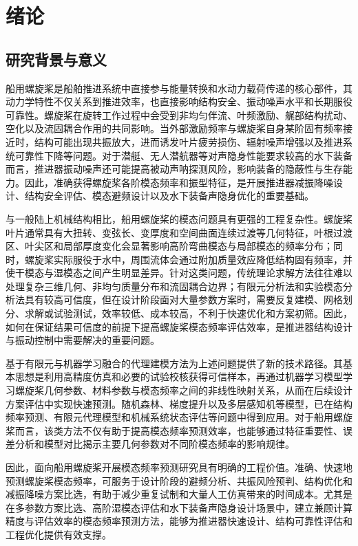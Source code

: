 \chapter{绪论}

\section{研究背景与意义}

船用螺旋桨是船舶推进系统中直接参与能量转换和水动力载荷传递的核心部件，其动力学特性不仅关系到推进效率，也直接影响结构安全、振动噪声水平和长期服役可靠性。螺旋桨在旋转工作过程中会受到非均匀伴流、叶频激励、艉部结构扰动、空化以及流固耦合作用的共同影响。当外部激励频率与螺旋桨自身某阶固有频率接近时，结构可能出现共振放大，进而诱发叶片疲劳损伤、辐射噪声增强以及推进系统可靠性下降等问题。对于潜艇、无人潜航器等对声隐身性能要求较高的水下装备而言，推进器振动噪声还可能提高被动声呐探测风险，影响装备的隐蔽性与生存能力\cite{intro:1}。因此，准确获得螺旋桨各阶模态频率和振型特征，是开展推进器减振降噪设计、结构安全评估、模态避频设计以及水下装备声隐身优化的重要基础\cite{intro:1,intro:2,intro:3,intro:4,intro:5}。

与一般陆上机械结构相比，船用螺旋桨的模态问题具有更强的工程复杂性。螺旋桨叶片通常具有大扭转、变弦长、变厚度和空间曲面连续过渡等几何特征，叶根过渡区、叶尖区和局部厚度变化会显著影响高阶弯曲模态与局部模态的频率分布；同时，螺旋桨实际服役于水中，周围流体会通过附加质量效应降低结构固有频率，并使干模态与湿模态之间产生明显差异\cite{intro:2,intro:3,intro:4,intro:5}。针对这类问题，传统理论求解方法往往难以处理复杂三维几何、非均匀质量分布和流固耦合边界；有限元分析法和实验模态分析法具有较高可信度，但在设计阶段面对大量参数方案时，需要反复建模、网格划分、求解或试验测试，效率较低、成本较高，不利于快速优化和方案初筛。因此，如何在保证结果可信度的前提下提高螺旋桨模态频率评估效率，是推进器结构设计与振动控制中需要解决的重要问题。

基于有限元与机器学习融合的代理建模方法为上述问题提供了新的技术路径。其基本思想是利用高精度仿真和必要的试验校核获得可信样本，再通过机器学习模型学习螺旋桨几何参数、材料参数与模态频率之间的非线性映射关系，从而在后续设计方案评估中实现快速预测。随机森林、梯度提升以及多层感知机等模型，已在结构频率预测、有限元代理模型和机械系统状态评估等问题中得到应用\cite{intro:7,intro:8,intro:9,intro:10,intro:11,intro:12,intro:13,intro:14,intro:15,intro:16,intro:17}。对于船用螺旋桨而言，该类方法不仅有助于提高模态频率预测效率，也能够通过特征重要性、误差分析和模型对比揭示主要几何参数对不同阶模态频率的影响规律。

因此，面向船用螺旋桨开展模态频率预测研究具有明确的工程价值。准确、快速地预测螺旋桨模态频率，可服务于设计阶段的避频分析、共振风险预判、结构优化和减振降噪方案比选，有助于减少重复试制和大量人工仿真带来的时间成本。尤其是在多参数方案比选、高阶湿模态评估和水下装备声隐身设计场景中，建立兼顾计算精度与评估效率的模态频率预测方法，能够为推进器快速设计、结构可靠性评估和工程优化提供有效支撑。

